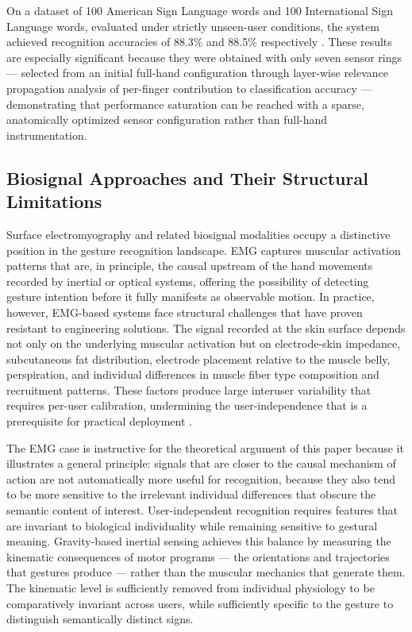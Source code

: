 \documentclass[11pt, a4paper]{article}
\theoremstyle{definition}
\begin{document}
On a dataset of 100 American Sign Language words and 100 International Sign Language words, evaluated under strictly unseen-user conditions, the system achieved recognition accuracies of 88.3\% and 88.5\% respectively \cite{park2026}. These results are especially significant because they were obtained with only seven sensor rings --- selected from an initial full-hand configuration through layer-wise relevance propagation analysis of per-finger contribution to classification accuracy --- demonstrating that performance saturation can be reached with a sparse, anatomically optimized sensor configuration rather than full-hand instrumentation.

\subsection{Biosignal Approaches and Their Structural Limitations}

Surface electromyography and related biosignal modalities occupy a distinctive position in the gesture recognition landscape. EMG captures muscular activation patterns that are, in principle, the causal upstream of the hand movements recorded by inertial or optical systems, offering the possibility of detecting gesture intention before it fully manifests as observable motion. In practice, however, EMG-based systems face structural challenges that have proven resistant to engineering solutions. The signal recorded at the skin surface depends not only on the underlying muscular activation but on electrode-skin impedance, subcutaneous fat distribution, electrode placement relative to the muscle belly, perspiration, and individual differences in muscle fiber type composition and recruitment patterns. These factors produce large interuser variability that requires per-user calibration, undermining the user-independence that is a prerequisite for practical deployment \cite{wu2016,wu2015,zhang2022}.

The EMG case is instructive for the theoretical argument of this paper because it illustrates a general principle: signals that are closer to the causal mechanism of action are not automatically more useful for recognition, because they also tend to be more sensitive to the irrelevant individual differences that obscure the semantic content of interest. User-independent recognition requires features that are invariant to biological individuality while remaining sensitive to gestural meaning. Gravity-based inertial sensing achieves this balance by measuring the kinematic consequences of motor programs --- the orientations and trajectories that gestures produce --- rather than the muscular mechanics that generate them. The kinematic level is sufficiently removed from individual physiology to be comparatively invariant across users, while sufficiently specific to the gesture to distinguish semantically distinct signs.
\end{document}

